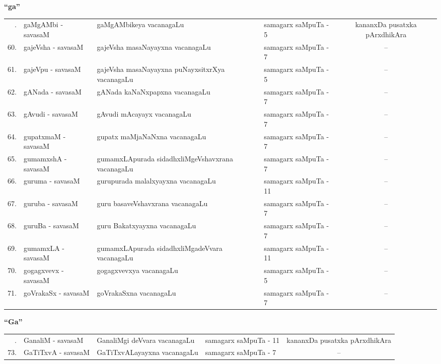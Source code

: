\centerline{\bf ``ga''}

{\renewcommand{\arraystretch}{1.3}
\begin{longtable}{rl>{\raggedright}p{5.5cm}lc}
\hline
\endfirsthead
\hline
\endhead
\hline
\endfoot
\endlastfoot
59. &  gaMgAMbi - savasaM & gaMgAMbikeya vacanagaLu & samagarx saMpuTa - 5  & kananxDa pusatxka pArxdhikAra\\
60. &  gajeVsha - savasaM & gajeVsha masaNayayxna vacanagaLu & samagarx saMpuTa - 7 & --\\
61. &  gajeVpu - savasaM & gajeVsha masaNayayxna puNayxsitxrXya vacanagaLu & samagarx saMpuTa - 5 & --\\
62. &  gANada - savasaM & gANada kaNaNxpapxna vacanagaLu & samagarx saMpuTa - 7 & --\\
63. &  gAvudi - savasaM &  gAvudi mAcayayx vacanagaLu & samagarx saMpuTa - 7 & --\\
64. &  gupatxmaM - savasaM & gupatx maMjaNaNxna vacanagaLu & samagarx saMpuTa - 7 & --\\
65. &  gumamxshA - savasaM & gumamxLApurada sidadhxliMgeVshavxrana vacanagaLu & samagarx saMpuTa - 7 & --\\
66. &  guruma - savasaM & gurupurada malalxyayxna vacanagaLu & samagarx saMpuTa - 11 & --\\
67. &  guruba - savasaM & guru basaveVshavxrana vacanagaLu & samagarx saMpuTa - 7 & --\\
68. &  guruBa - savasaM & guru Bakatxyayxna vacanagaLu & samagarx saMpuTa - 7 & --\\
69. &  gumamxLA - savasaM & gumamxLApurada sidadhxliMgadeVvara vacanagaLu & samagarx saMpuTa - 11 & --\\
70. & gogagxvevx  - savasaM & gogagxvevxya vacanagaLu & samagarx saMpuTa - 5 & --\\
71. &  goVrakaSx - savasaM & goVrakaSxna vacanagaLu & samagarx saMpuTa - 7 & --\\
\hline
\end{longtable}}

\centerline{\bf ``Ga''}

{\renewcommand{\arraystretch}{1.3}
\begin{longtable}{rl>{\raggedright}p{5.5cm}lc}
\hline
\endfirsthead
\hline
\endhead
\hline
\endfoot
\endlastfoot
72. &  GanaliM - savasaM & GanaliMgi deVvara vacanagaLu & samagarx saMpuTa - 11  & kananxDa pusatxka pArxdhikAra\\
73. &  GaTiTxvA - savasaM & GaTiTxvALayayxna vacanagaLu & samagarx saMpuTa - 7 & --\\
\hline
\end{longtable}}

